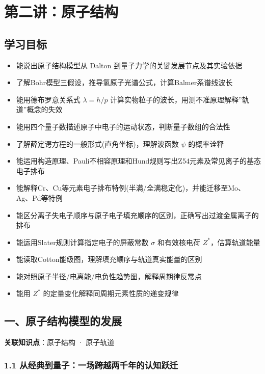 \section{第二讲：原子结构}\label{ux7b2cux4e8cux8bb2ux539fux5b50ux7ed3ux6784}

\subsection{学习目标}\label{ux5b66ux4e60ux76eeux6807}

\begin{itemize}
\tightlist
\item
  能说出原子结构模型从 Dalton 到量子力学的关键发展节点及其实验依据
\item
  了解Bohr模型三假设，推导氢原子光谱公式，计算Balmer系谱线波长
\item
  能用德布罗意关系式 \(\lambda = h/p\) 计算实物粒子的波长，用测不准原理解释''轨道''概念的失效
\item
  能用四个量子数描述原子中电子的运动状态，判断量子数组的合法性
\item
  了解薛定谔方程的一般形式(直角坐标)，理解波函数 \(\psi\) 的概率诠释
\item
  能运用构造原理、Pauli不相容原理和Hund规则写出Z54元素及常见离子的基态电子排布
\item
  能解释Cr、Cu等元素电子排布特例(半满/全满稳定化)，并能迁移至Mo、Ag、Pd等特例
\item
  能区分离子失电子顺序与原子电子填充顺序的区别，正确写出过渡金属离子的排布
\item
  能运用Slater规则计算指定电子的屏蔽常数 \(\sigma\) 和有效核电荷 \(Z^*\)，估算轨道能量
\item
  能读取Cotton能级图，理解填充顺序与轨道真实能量的区别
\item
  能对照原子半径/电离能/电负性趋势图，解释周期律反常点
\item
  能用 \(Z^*\) 的定量变化解释同周期元素性质的递变规律
\end{itemize}

\subsection{一、原子结构模型的发展}\label{ux4e00ux539fux5b50ux7ed3ux6784ux6a21ux578bux7684ux53d1ux5c55}

\textbf{关联知识点}：原子结构 · 原子轨道

\subsubsection{1.1 从经典到量子：一场跨越两千年的认知跃迁}\label{ux4eceux7ecfux5178ux5230ux91cfux5b50ux4e00ux573aux8de8ux8d8aux4e24ux5343ux5e74ux7684ux8ba4ux77e5ux8dc3ux8fc1}

